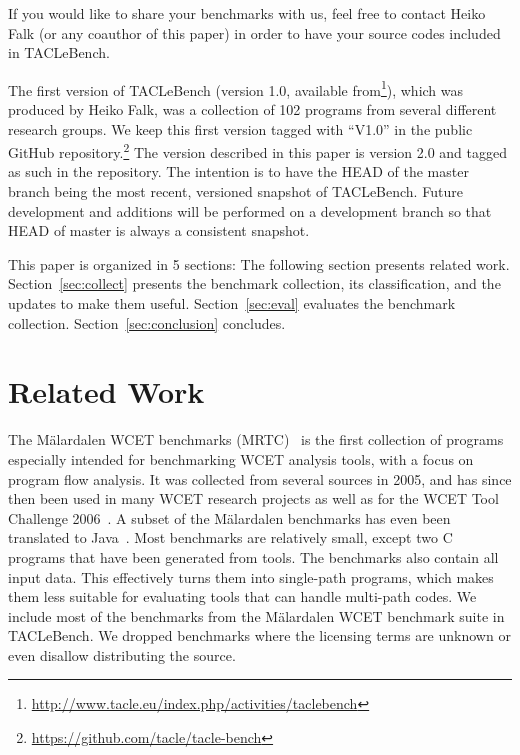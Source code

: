 \documentclass[a4paper,UKenglish]{oasics}
\begin{document}
If you would like to share your  benchmarks with us,
feel free to contact Heiko Falk (or any coauthor of this paper) in order
to have your source codes included in TACLeBench.

The first version of TACLeBench (version 1.0, available
from\footnote{\url{http://www.tacle.eu/index.php/activities/taclebench}}), which was produced
by Heiko Falk, was a collection of 102 programs from several different
research groups. We keep this first version tagged with ``V1.0'' in the public
GitHub repository.\footnote{\url{https://github.com/tacle/tacle-bench}}
The version described in this paper is version 2.0 and tagged as such in the
repository.
The intention is to have the HEAD of the master branch being
the most recent, versioned snapshot of TACLeBench.
Future development and additions will be performed on a development
branch so that HEAD of master is always a consistent snapshot.

This paper is organized in 5 sections: The following section presents related work.
Section~\ref{sec:collect} presents the benchmark collection, its classification, and the updates
to make them useful.
Section~\ref{sec:eval} evaluates the benchmark collection.
Section~\ref{sec:conclusion} concludes.

\section{Related Work}
\label{sec:related}

The M{\"a}lardalen WCET benchmarks (MRTC)~\cite{wcet:bench:2012} is the first collection of programs especially
intended for benchmarking WCET analysis tools, with a focus on program flow analysis.
It was collected from several sources in 2005, and has since then been
used in many WCET research projects as well as for the WCET Tool Challenge 2006~\cite{Gustafsson:ISOLA2006}.
A subset of the M{\"a}lardalen benchmarks has even been translated to
Java~\cite{jop:volta:rtas2008}. Most benchmarks are relatively small, except
two C programs that have been generated from tools.
The benchmarks also contain all input data. This effectively turns them into single-path programs, which
makes them less suitable for evaluating tools that can handle multi-path codes.
We include most of the benchmarks from the
M{\"a}lardalen WCET benchmark suite in TACLeBench.
We dropped benchmarks where the licensing terms are unknown
or even disallow distributing the source.
\end{document}
